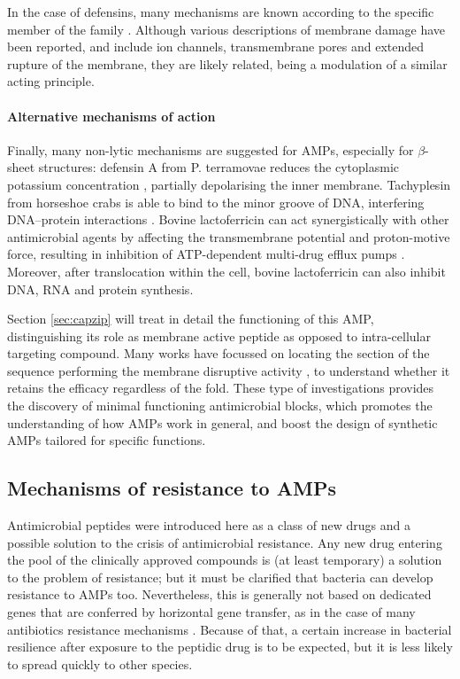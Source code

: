 In the case of defensins, many mechanisms are known according to the specific member of the family \citep{Lehrer2004,Kagan1990,Takeuchi2004}.
%
Although various descriptions of membrane damage have been reported, and include ion channels, transmembrane pores and extended rupture of the membrane, they are likely related, being a modulation of a similar acting principle.


\paragraph{Alternative mechanisms of action} Finally, many non-lytic mechanisms are suggested for AMPs, especially for $\beta$-sheet structures: defensin A from P. terramovae reduces the cytoplasmic potassium concentration \citep{Brogden2005}, partially depolarising the inner membrane. Tachyplesin from horseshoe crabs is able to bind to the minor groove of DNA, interfering DNA–protein interactions \citep{Yonezawa1992}.
%
Bovine lactoferricin can act synergistically with other antimicrobial agents by affecting the transmembrane potential and proton-motive force, resulting in inhibition of ATP-dependent multi-drug efflux pumps \citep{Gifford2005}.
%
Moreover, after translocation within the cell, bovine lactoferricin can also inhibit DNA, RNA and protein synthesis.

Section \ref{sec:capzip} will treat in detail the functioning of this AMP, distinguishing its role as membrane active peptide as opposed to intra-cellular targeting compound. Many works have focussed on locating the section of the sequence performing the membrane disruptive activity \citep{Tomita1994,Schibli1999}, to understand whether it retains the efficacy regardless of the fold.
%
These type of investigations provides the discovery of minimal functioning antimicrobial blocks, which promotes the understanding of how AMPs work in general, and boost the design of synthetic AMPs tailored for specific functions.


\subsection{Mechanisms of resistance to AMPs}

Antimicrobial peptides were introduced here as a class of new drugs and a possible solution to the crisis of antimicrobial resistance. Any new drug entering the pool of the clinically approved compounds is (at least temporary) a solution to the problem of resistance; but it must be clarified that bacteria can develop resistance to AMPs too.
%
Nevertheless, this is generally not based on dedicated genes that are conferred by horizontal gene transfer, as in the case of many antibiotics resistance mechanisms \citep{Peschel2006}. Because of that, a certain increase in bacterial resilience after exposure to the peptidic drug is to be expected, but it is less likely to spread quickly to other species.

